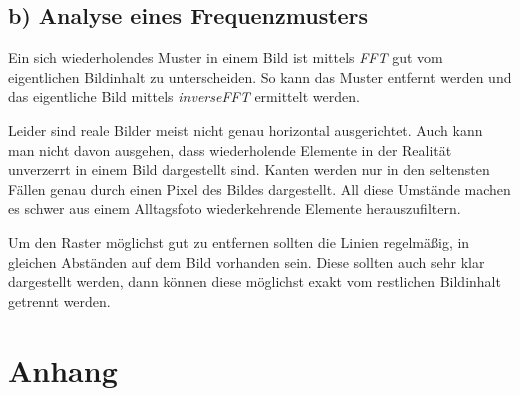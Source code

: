 \documentclass[12pt,german]{article}
\begin{document}
\subsection{b) Analyse eines Frequenzmusters}
Ein sich wiederholendes Muster in einem Bild ist mittels \textit{FFT} gut vom eigentlichen Bildinhalt zu unterscheiden. So kann das Muster entfernt werden und das eigentliche Bild mittels \textit{inverseFFT} ermittelt werden.

Leider sind reale Bilder meist nicht genau horizontal ausgerichtet. Auch kann man nicht davon ausgehen, dass  wiederholende Elemente in der Realität unverzerrt in einem Bild dargestellt sind. Kanten werden nur in den seltensten Fällen genau durch einen Pixel des Bildes dargestellt. All diese Umstände machen es schwer aus einem Alltagsfoto wiederkehrende Elemente herauszufiltern. 

Um den Raster  möglichst gut zu entfernen sollten die Linien regelmäßig, in gleichen Abständen auf dem Bild vorhanden sein. Diese sollten auch sehr klar dargestellt werden, dann können diese möglichst exakt vom restlichen Bildinhalt getrennt werden.


\section{Anhang}

\end{document}
